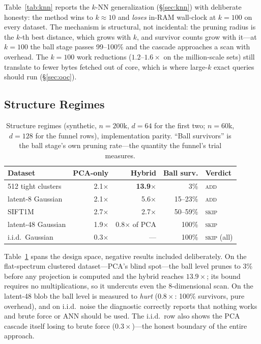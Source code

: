 \documentclass[sigconf,nonacm]{acmart}
\begin{document}
Table~\ref{tab:knn} reports the $k$-NN generalization
(\S\ref{sec:knn}) with deliberate honesty: the method wins to
$k \approx 10$ and \emph{loses} in-RAM wall-clock at $k = 100$ on every
dataset. The mechanism is structural, not incidental: the pruning radius
is the $k$-th best distance, which grows with $k$, and survivor counts
grow with it---at $k{=}100$ the ball stage passes 99--100\% and the
cascade approaches a scan with overhead. The $k{=}100$ work reductions
($1.2$--$1.6\times$ on the million-scale sets) still translate to fewer
bytes fetched out of core, which is where large-$k$ exact queries should
run (\S\ref{sec:ooc}).

\subsection{Structure Regimes}
\label{sec:regimes}

\begin{table}[t]
\caption{Structure regimes (synthetic, $n=200$k, $d=64$ for the first two;
$n=60$k, $d=128$ for the funnel rows), implementation parity. ``Ball
survivors'' is the ball stage's own pruning rate---the quantity the funnel's
trial measures.}
\label{tab:regimes}
\small
\begin{tabular}{@{}lrrrl@{}}
\toprule
Dataset & PCA-only & Hybrid & Ball surv. & Verdict \\
\midrule
512 tight clusters & 2.1$\times$ & \textbf{13.9$\times$} & 3\% & \textsc{add} \\
latent-8 Gaussian & 2.1$\times$ & 5.6$\times$ & 15--23\% & \textsc{add} \\
SIFT1M & 2.7$\times$ & 2.7$\times$ & 50--59\% & \textsc{skip} \\
latent-48 Gaussian & 1.9$\times$ & 0.8$\times$ of PCA & 100\% & \textsc{skip} \\
i.i.d.\ Gaussian & 0.3$\times$ & --- & 100\% & \textsc{skip} (all) \\
\bottomrule
\end{tabular}
\end{table}

Table~\ref{tab:regimes} spans the design space, negative results included
deliberately. On the flat-spectrum clustered dataset---PCA's blind
spot---the ball level prunes to 3\% before any projection is computed and
the hybrid reaches $13.9\times$; its bound requires no multiplications, so
it undercuts even the 8-dimensional scan. On the latent-48 blob the ball
level is measured to \emph{hurt} ($0.8\times$: 100\% survivors, pure
overhead), and on i.i.d.\ noise the diagnostic correctly reports that
nothing works and brute force or ANN should be used. The i.i.d.\ row also
shows the PCA cascade itself losing to brute force ($0.3\times$)---the
honest boundary of the entire approach.
\end{document}
